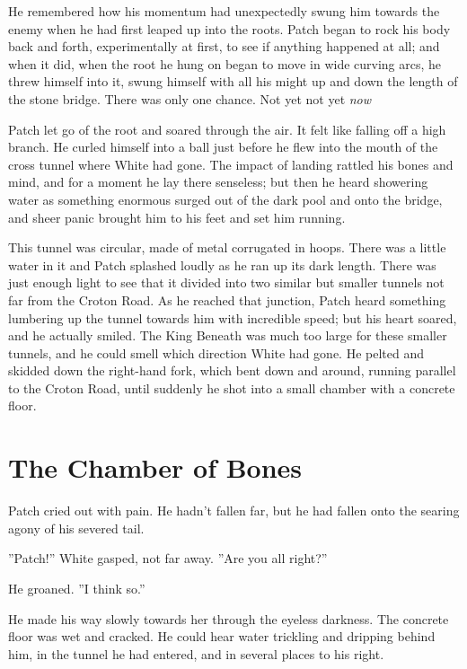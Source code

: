 \documentclass[12pt]{book}
\begin{document}
He remembered how his momentum had unexpectedly swung him towards the enemy when he had first leaped up into the roots. Patch began to rock his body back and forth, experimentally at first, to see if anything happened at all; and when it did, when the root he hung on began to move in wide curving arcs, he threw himself into it, swung himself with all his might up and down the length of the stone bridge. There was only one chance. Not yet %
not yet %
{\it now} %

Patch let go of the root and soared through the air. It felt like falling off a high branch. He curled himself into a ball just before he flew into the mouth of the cross tunnel where White had gone. The impact of landing rattled his bones and mind, and for a moment he lay there senseless; but then he heard showering water as something enormous surged out of the dark pool and onto the bridge, and sheer panic brought him to his feet and set him running.

This tunnel was circular, made of metal corrugated in hoops. There was a little water in it and Patch splashed loudly as he ran up its dark length. There was just enough light to see that it divided into two similar but smaller tunnels not far from the Croton Road. As he reached that junction, Patch heard something lumbering up the tunnel towards him with incredible speed; but his heart soared, and he actually smiled. The King Beneath was much too large for these smaller tunnels, and he could smell which direction White had gone. He pelted and skidded down the right-hand fork, which bent down and around, running parallel to the Croton Road, until suddenly he shot into a small chamber with a concrete floor.


\section{The Chamber of Bones}

Patch cried out with pain. He hadn't fallen far, but he had fallen onto the searing agony of his severed tail.

''Patch!'' White gasped, not far away. ''Are you all right?''

He groaned. ''I think so.''

He made his way slowly towards her through the eyeless darkness. The concrete floor was wet and cracked. He could hear water trickling and dripping behind him, in the tunnel he had entered, and in several places to his right.
\end{document}
